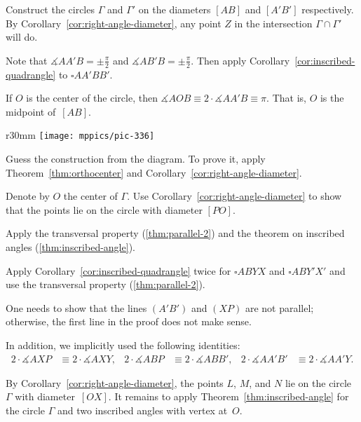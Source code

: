 Construct the circles $\Gamma$ and $\Gamma'$
on the diameters $[AB]$ and $[A'B']$ respectively.
By Corollary~\ref{cor:right-angle-diameter},
any point $Z$ in the intersection $\Gamma\cap \Gamma'$ will do.


Note that $\measuredangle AA'B=\pm\tfrac\pi2$ and $\measuredangle AB'B=\pm\tfrac\pi2$.
Then apply Corollary~\ref{cor:inscribed-quadrangle}
to $\square AA'BB'$.

If $O$ is the center of the circle, then 
$\measuredangle AOB\equiv 2\cdot \measuredangle AA'B\equiv\pi$.
That is, $O$ is the midpoint of~$[AB]$.

\begin{wrapfigure}{r}{30mm}
\vskip-2mm
\centering
\texttt{[image: mppics/pic-336]}
\end{wrapfigure}

Guess the construction from the diagram.
To prove it,
apply Theorem~\ref{thm:orthocenter} and Corollary~\ref{cor:right-angle-diameter}.

Denote by $O$ the center of $\Gamma$.
Use Corollary~\ref{cor:right-angle-diameter} to show that the points lie on the circle with diameter $[PO]$.

 Apply the transversal property (\ref{thm:parallel-2}) and the theorem on inscribed angles (\ref{thm:inscribed-angle}).

Apply Corollary~\ref{cor:inscribed-quadrangle} twice for $\square ABYX$ and $\square ABY'X'$ and use the transversal property (\ref{thm:parallel-2}).


One needs to show that the lines $(A'B')$ and $(XP)$ are not parallel; otherwise, the first line in the proof does not make sense.



In addition, we implicitly used the following identities:
\begin{align*}
2\cdot \measuredangle AXP&\equiv2\cdot \measuredangle AXY,
&
2\cdot \measuredangle ABP&\equiv2\cdot \measuredangle ABB',
&
2\cdot \measuredangle AA'B'&\equiv2\cdot \measuredangle AA'Y.
\end{align*}

By Corollary~\ref{cor:right-angle-diameter},
the points $L$, $M$, and $N$ lie on the circle $\Gamma$ with diameter~$[OX]$.
It remains to apply Theorem~\ref{thm:inscribed-angle} for the circle $\Gamma$ 
and two inscribed angles with vertex at~$O$.

